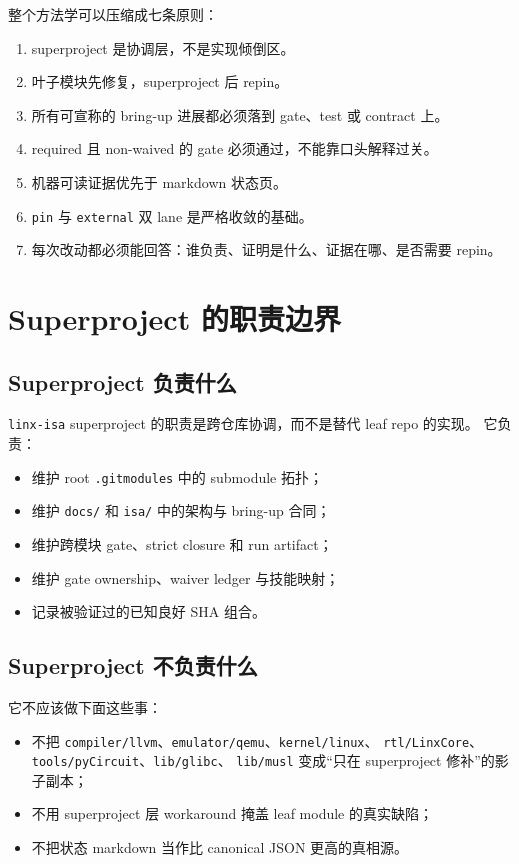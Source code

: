\documentclass[UTF8,11pt,a4paper]{ctexart}
\begin{document}
整个方法学可以压缩成七条原则：

\begin{enumerate}
  \item superproject 是协调层，不是实现倾倒区。
  \item 叶子模块先修复，superproject 后 repin。
  \item 所有可宣称的 bring-up 进展都必须落到 gate、test 或 contract 上。
  \item required 且 non-waived 的 gate 必须通过，不能靠口头解释过关。
  \item 机器可读证据优先于 markdown 状态页。
  \item \texttt{pin} 与 \texttt{external} 双 lane 是严格收敛的基础。
  \item 每次改动都必须能回答：谁负责、证明是什么、证据在哪、是否需要 repin。
\end{enumerate}

\section{Superproject 的职责边界}

\subsection{Superproject 负责什么}

\texttt{linx-isa} superproject 的职责是跨仓库协调，而不是替代 leaf repo 的实现。
它负责：

\begin{itemize}
  \item 维护 root \texttt{.gitmodules} 中的 submodule 拓扑；
  \item 维护 \texttt{docs/} 和 \texttt{isa/} 中的架构与 bring-up 合同；
  \item 维护跨模块 gate、strict closure 和 run artifact；
  \item 维护 gate ownership、waiver ledger 与技能映射；
  \item 记录被验证过的已知良好 SHA 组合。
\end{itemize}

\subsection{Superproject 不负责什么}

它不应该做下面这些事：

\begin{itemize}
  \item 不把 \texttt{compiler/llvm}、\texttt{emulator/qemu}、\texttt{kernel/linux}、
  \texttt{rtl/LinxCore}、\texttt{tools/pyCircuit}、\texttt{lib/glibc}、
  \texttt{lib/musl} 变成“只在 superproject 修补”的影子副本；
  \item 不用 superproject 层 workaround 掩盖 leaf module 的真实缺陷；
  \item 不把状态 markdown 当作比 canonical JSON 更高的真相源。
\end{itemize}
\end{document}
